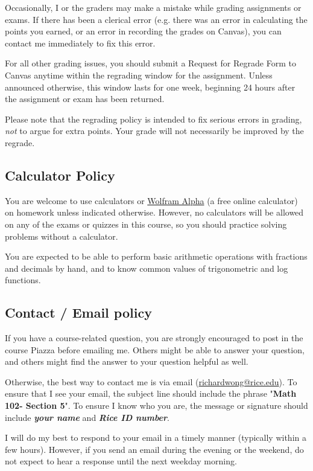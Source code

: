 \documentclass[11pt]{article}
\newcommand{\course}{Math 102}
\newcommand{\lecturenumber}{Section 5}
\begin{document}
Occasionally, I or the graders may make a mistake while grading assignments or exams.  If there has been a clerical error (e.g. there was an error in calculating the points you earned, or an error in recording the grades on Canvas), you can contact me immediately to fix this error.

For all other grading issues, you should submit a Request for Regrade Form to Canvas anytime within the regrading window for the assignment.  Unless announced otherwise, this window lasts for one week, beginning 24 hours after the assignment or exam has been returned.

Please note that the regrading policy is intended to fix serious errors in grading, \emph{not} to argue for extra points.  Your grade will not necessarily be improved by the regrade.

\subsection*{Calculator Policy}

You are welcome to use calculators or \href{https://www.wolframalpha.com/}{Wolfram Alpha} (a free online calculator) on homework unless indicated otherwise.  However, no calculators will be allowed on any of the exams or quizzes in this course, so you should practice solving problems without a calculator.  

You are expected to be able to perform basic arithmetic operations with fractions and decimals by hand, and to know common values of trigonometric and log functions.

\subsection{Contact / Email policy}

If you have a course-related question, you are strongly encouraged to post in the course Piazza before emailing me.   Others might be able to answer your question, and others might find the answer to your question helpful as well.

Otherwise, the best way to contact me is via email (\href{mailto:richardwong@rice.edu}{richardwong@rice.edu}).  To ensure that I see your email, the subject line should include the phrase "\textbf{\course - \lecturenumber}".   To ensure I know who you are, the message or signature should include \emph{\textbf{your name}} and \emph{\textbf{Rice ID number}}.  

I will do my best to respond to your email in a timely manner (typically within a few hours).  However, if you send an email during the evening or the weekend, do not expect to hear a response until the next weekday morning.  
\end{document}
